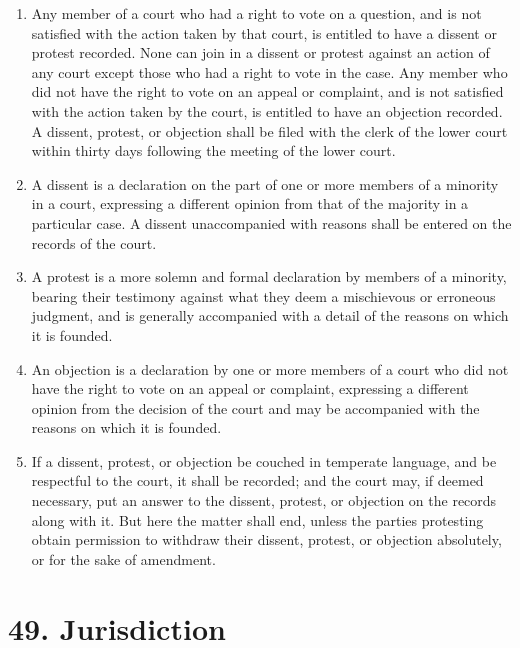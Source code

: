 \documentclass[
]{book}
\providecommand{\tightlist}{%
  \setlength{\itemsep}{0pt}\setlength{\parskip}{0pt}}
\begin{document}
\protect\hypertarget{chapter-slug-48-dissents-protests-and-objections}{\href{}{}}

\begin{enumerate}
\def\labelenumi{\arabic{enumi}.}
\tightlist
\item
  \protect\hypertarget{48}{\href{}{}}Any member of a court who had a right to vote on a question, and is not satisfied with the action taken by that court, is entitled to have a dissent or protest recorded. None can join in a dissent or protest against an action of any court except those who had a right to vote in the case. Any member who did not have the right to vote on an appeal or complaint, and is not satisfied with the action taken by the court, is entitled to have an objection recorded. A dissent, protest, or objection shall be filed with the clerk of the lower court within thirty days following the meeting of the lower court.
\item
  A dissent is a declaration on the part of one or more members of a minority in a court, expressing a different opinion from that of the majority in a particular case. A dissent unaccompanied with reasons shall be entered on the records of the court.
\item
  A protest is a more solemn and formal declaration by members of a minority, bearing their testimony against what they deem a mischievous or erroneous judgment, and is generally accompanied with a detail of the reasons on which it is founded.
\item
  An objection is a declaration by one or more members of a court who did not have the right to vote on an appeal or complaint, expressing a different opinion from the decision of the court and may be accompanied with the reasons on which it is founded.
\item
  If a dissent, protest, or objection be couched in temperate language, and be respectful to the court, it shall be recorded; and the court may, if deemed necessary, put an answer to the dissent, protest, or objection on the records along with it. But here the matter shall end, unless the parties protesting obtain permission to withdraw their dissent, protest, or objection absolutely, or for the sake of amendment.
\end{enumerate}

\hypertarget{jurisdiction}{%
\section*{49. Jurisdiction}\label{jurisdiction}}
\end{document}
